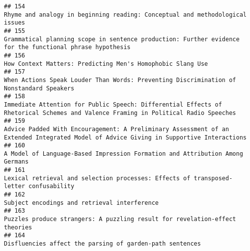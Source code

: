 \documentclass[
  english,
  man]{apa6}
\begin{document}
\begin{verbatim}
## 154                                                                                                                                                             Rhyme and analogy in beginning reading: Conceptual and methodological issues
## 155                                                                                                                                 Grammatical planning scope in sentence production: Further evidence for the functional phrase hypothesis
## 156                                                                                                                                                                               How Context Matters: Predicting Men's Homophobic Slang Use
## 157                                                                                                                                                  When Actions Speak Louder Than Words: Preventing Discrimination of Nonstandard Speakers
## 158                                                                                                        Immediate Attention for Public Speech: Differential Effects of Rhetorical Schemes and Valence Framing in Political Radio Speeches
## 159                                                                                                   Advice Padded With Encouragement: A Preliminary Assessment of an Extended Integrated Model of Advice Giving in Supportive Interactions
## 160                                                                                                                                                             A Model of Language-Based Impression Formation and Attribution Among Germans
## 161                                                                                                                                                    Lexical retrieval and selection processes: Effects of transposed-letter confusability
## 162                                                                                                                                                                                             Subject encodings and retrieval interference
## 163                                                                                                                                                              Puzzles produce strangers: A puzzling result for revelation-effect theories
## 164                                                                                                                                                                                 Disfluencies affect the parsing of garden-path sentences

\end{verbatim}
\end{document}
